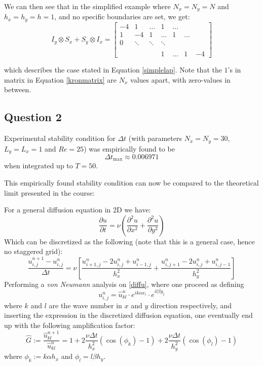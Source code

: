 \documentclass[10pt]{report}
\newcommand{\dt}{\Delta t}
\newcommand{\p}{\partial}
\begin{document}
We can then see that in the simplified example where $N_x = N_y = N$ and $h_x = h_y = h = 1$, and no specific boundaries are set, we get:
\begin{equation}
    I_y \otimes S_x + S_y \otimes I_x = \begin{bmatrix}
        -4&1&\hdots&1&\hdots\\
        1&-4&1&\hdots&1&\hdots\\
        0 &\ddots&\ddots &\ddots \\\\
        &&&1&\hdots&1&-4
    \end{bmatrix} \label{kronmatrix}
\end{equation}

which describes the case stated in Equation \ref{simplelap}. Note that the $1$'s in matrix in Equation \ref{kronmatrix} are $N_x$ 
values apart, with zero-values in between.
\subsection*{Question 2}
Experimental stability condition for $\Delta t$ 
(with parameters $N_x = N_y = 30$, $L_y = L_x = 1$ and $Re = 25$) was empirically found to be
\[
\Delta t_{\text{max}} \approx 0.006971
\]
when integrated up to $T = 50$.

This empirically found stability condition can now be compared to the theoretical limit presented in the course:

For a general diffusion equation in 2D we have:
\begin{equation*}
    \frac{\p u}{\p t} = \nu \left(\frac{\p^2 u}{\p x^2}+ \frac{\p^2 u}{\p y^2}\right)
\end{equation*}
Which can be discretized as the following (note that this is a general case, hence no staggered grid):
\begin{equation}
    \frac{u^{n+1}_{i,j}-u^{n}_{i,j}}{\dt} = \nu \left[\frac{u^n_{i+1,j}-2u^n_{i,j}+u^n_{i-1,j}}{h_x^2} 
    + \frac{u^n_{i,j+1}-2u^n_{i,j}+u^n_{i,j-1}}{h_y^2} \right] \label{diffu}
\end{equation}
Performing a \textit{von Neumann} analysis on \ref{diffu}, where one proceed as defining 
\[u_{i,j}^n = \hat{u}^n_{kl}\cdot e^{ik\alpha x_i}\cdot e^{il\beta y_j}\] 
where $k$ and $l$ are the wave number in $x$ and $y$
direction respectively, and inserting the expression in the discretized diffusion equation, 
one eventually end up with the following
amplification factor:
\begin{equation}
    \hat{G} := \frac{\hat{u}^{n+1}_{kl}}{\hat{u}^n_{kl}} = 1+2\frac{\nu \dt}{h_x^2}(\cos(\phi_k)-1)
    +2\frac{\nu \dt}{h_y^2}(\cos(\phi_l) -1)
\end{equation}
where $\phi_k := k\alpha h_x$ and $\phi_l = l\beta h_y$.
\end{document}
